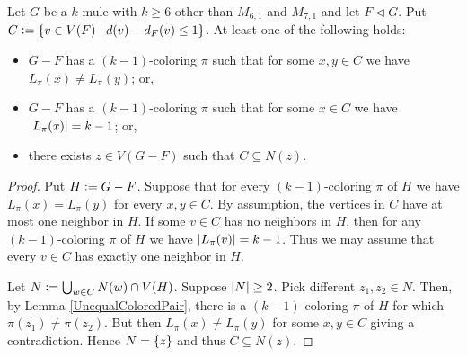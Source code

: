 \begin{lem}\label{JoinerOrDifferentLists}
Let $G$ be a $k$-mule with $k \geq 6$ other than $M_{6,1}$ and $M_{7,1}$ and let $F \lhd G$.  
Put $C \mathrel{\mathop:}= \left\{ v \in V(F) \mid d(v) - d_F(v) \leq 1 \right\}$.  At least one of the following holds:
\begin{itemize}
\item $G - F$ has a $(k - 1)$-coloring $\pi$ such that for some $x, y \in C$ we have $L_{\pi}(x) \neq L_{\pi}(y)$; or,
\item $G - F$ has a $(k - 1)$-coloring $\pi$ such that for some $x \in C$ we have $\left|L_{\pi}(x)\right| = k - 1$; or,
\item there exists $z \in V(G - F)$ such that $C \subseteq N(z)$.
\end{itemize}
\end{lem}
\begin{proof}
Put $H \mathrel{\mathop:}= G - F$.  
Suppose that for every $(k - 1)$-coloring $\pi$ of $H$ we have $L_{\pi}(x) = L_{\pi}(y)$ for every $x, y \in C$.  
By assumption, the vertices in $C$ have at most one neighbor in $H$.  
If some $v \in C$ has no neighbors in $H$, then for any $(k - 1)$-coloring $\pi$ of $H$ we have $\left|L_{\pi}(v)\right| = k - 1$.  
Thus we may assume that every $v \in C$ has exactly one neighbor in $H$. 

Let $N \mathrel{\mathop:}= \bigcup_{w \in C} N(w) \cap V(H)$. Suppose $\left|N\right| \geq 2$.
Pick different $z_1, z_2 \in N$. Then, by Lemma \ref{UnequalColoredPair}, there is a $(k - 1)$-coloring $\pi$ of $H$ for which $\pi(z_1) \neq \pi(z_2)$.  
But then $L_{\pi}(x) \neq L_{\pi}(y)$ for some $x, y \in C$ giving a contradiction.  Hence $N = \left\{ z \right\}$ and thus $C \subseteq N(z)$.
\end{proof}

